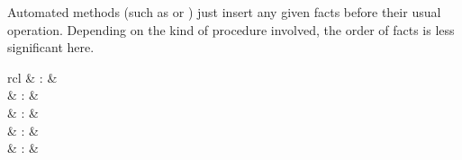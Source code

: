 \begin{isabellebody}
\begin{isamarkuptext}
  Automated methods (such as \hyperlink{method.simp}{\mbox{}} or \hyperlink{method.auto}{\mbox{}}) just
  insert any given facts before their usual operation.  Depending on
  the kind of procedure involved, the order of facts is less
  significant here.%
\end{isamarkuptext}%
\isamarkuptrue%
%
\isamarkuptrue%
%
\begin{isamarkuptext}%
\begin{matharray}{rcl}
    \hypertarget{command.lemma}{\hyperlink{command.lemma}{\mbox{}}} & : &  \\
    \hypertarget{command.theorem}{\hyperlink{command.theorem}{\mbox{}}} & : &  \\
    \hypertarget{command.corollary}{\hyperlink{command.corollary}{\mbox{}}} & : &  \\
    \hypertarget{command.schematic-lemma}{\hyperlink{command.schematic-lemma}{\mbox{}}} & : &  \\
    \hypertarget{command.schematic-theorem}{\hyperlink{command.schematic-theorem}{\mbox{}}} & : &  \\

\end{matharray}
\end{isamarkuptext}
\end{isabellebody}
